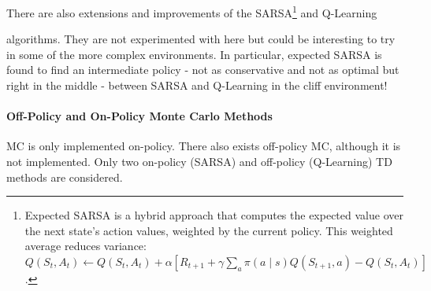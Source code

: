 \documentclass[12pt]{article}
\begin{document}
There are also extensions and improvements of the SARSA\footnote{
	Expected SARSA is a hybrid approach that computes the expected value over the next state's action values, weighted by the current policy.
	This weighted average reduces variance: $Q(S_t,A_t) \leftarrow Q(S_t,A_t) + \alpha [ R_{t+1} + \gamma \sum_a{\pi(a \mid s) Q(S_{t+1}, a)} - Q(S_t,A_t) ]$.
} and Q-Learning


algorithms.
They are not experimented with here but could be interesting to try in some of the more complex environments.
In particular, expected SARSA is found to find an intermediate policy - not as conservative and not as optimal but right in the middle - between SARSA and Q-Learning in the cliff environment!

\paragraph{Off-Policy and On-Policy Monte Carlo Methods}

MC is only implemented on-policy. There also exists off-policy MC, although it is not implemented.
Only two on-policy (SARSA) and off-policy (Q-Learning) TD methods are considered.
\end{document}
